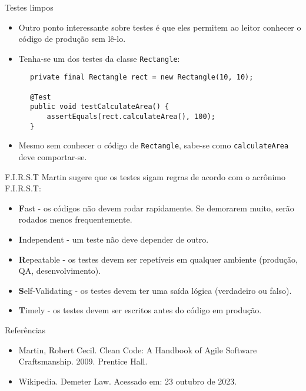 \documentclass[11pt]{beamer}
\begin{document}
  \begin{frame}[fragile]{Testes limpos}
    \begin{itemize}
      \item Outro ponto interessante sobre testes é que eles permitem ao leitor conhecer o código de produção sem lê-lo.
      \item Tenha-se um dos testes da classe \verb|Rectangle|:
    \end{itemize}
    \begin{lstlisting}
      private final Rectangle rect = new Rectangle(10, 10);

      @Test
      public void testCalculateArea() {
          assertEquals(rect.calculateArea(), 100);
      }
    \end{lstlisting}
    \begin{itemize}
      \item Mesmo sem conhecer o código de \verb|Rectangle|, sabe-se como \verb|calculateArea| deve comportar-se.
    \end{itemize}
  \end{frame}

  \begin{frame}{F.I.R.S.T}
    Martin sugere que os testes sigam regras de acordo com o acrônimo F.I.R.S.T:
    \begin{itemize}
      \item \textbf{F}ast - os códigos não devem rodar rapidamente. Se demorarem muito, serão rodados menos frequentemente.
      \item \textbf{I}ndependent - um teste não deve depender de outro.
      \item \textbf{R}epeatable - os testes devem ser repetíveis em qualquer ambiente (produção, QA, desenvolvimento).
      \item \textbf{S}elf-Validating - os testes devem ter uma saída lógica (verdadeiro ou falso).
      \item \textbf{T}imely - os testes devem ser escritos antes do código em produção.
    \end{itemize}
  \end{frame}

  \begin{frame}{Referências}
    \begin{itemize}
      \item Martin, Robert Cecil. Clean Code: A Handbook of Agile Software Craftsmanship. 2009. Prentice Hall.
      \item Wikipedia. Demeter Law. Acessado em: 23 outubro de 2023.
    \end{itemize}
  \end{frame}
\end{document}
